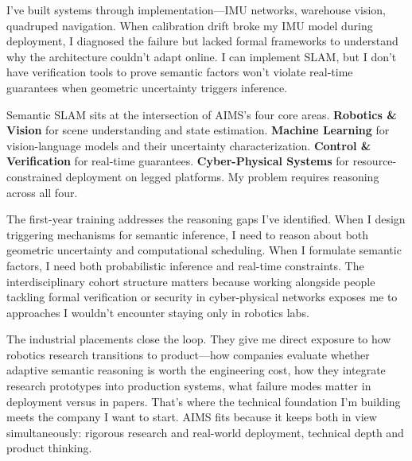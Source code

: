 \documentclass[11pt,a4paper]{article}
\begin{document}
I've built systems through implementation—IMU networks, warehouse vision, quadruped navigation. When calibration drift broke my IMU model during deployment, I diagnosed the failure but lacked formal frameworks to understand why the architecture couldn't adapt online. I can implement SLAM, but I don't have verification tools to prove semantic factors won't violate real-time guarantees when geometric uncertainty triggers inference.

Semantic SLAM sits at the intersection of AIMS's four core areas. \textbf{Robotics \& Vision} for scene understanding and state estimation. \textbf{Machine Learning} for vision-language models and their uncertainty characterization. \textbf{Control \& Verification} for real-time guarantees. \textbf{Cyber-Physical Systems} for resource-constrained deployment on legged platforms. My problem requires reasoning across all four.

The first-year training addresses the reasoning gaps I've identified. When I design triggering mechanisms for semantic inference, I need to reason about both geometric uncertainty and computational scheduling. When I formulate semantic factors, I need both probabilistic inference and real-time constraints. The interdisciplinary cohort structure matters because working alongside people tackling formal verification or security in cyber-physical networks exposes me to approaches I wouldn't encounter staying only in robotics labs.

The industrial placements close the loop. They give me direct exposure to how robotics research transitions to product—how companies evaluate whether adaptive semantic reasoning is worth the engineering cost, how they integrate research prototypes into production systems, what failure modes matter in deployment versus in papers. That's where the technical foundation I'm building meets the company I want to start. AIMS fits because it keeps both in view simultaneously: rigorous research and real-world deployment, technical depth and product thinking.



\end{document}
